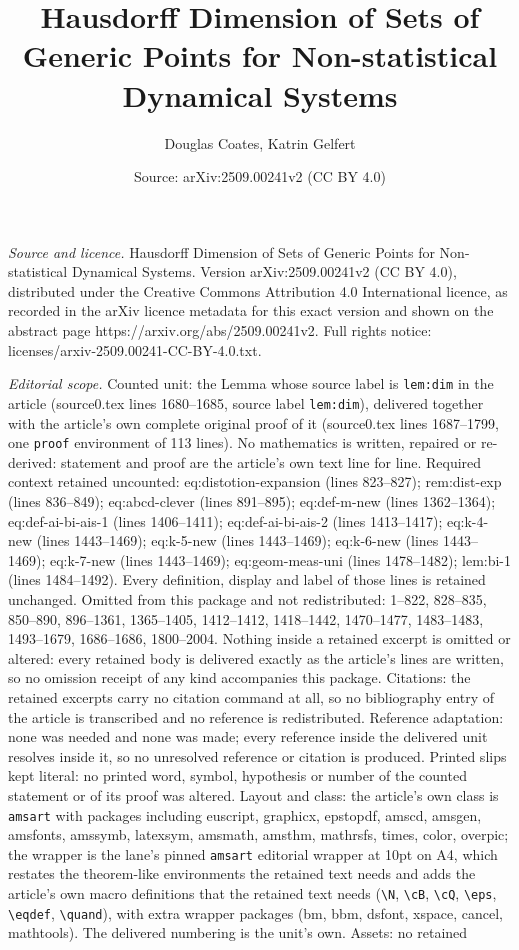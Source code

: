 \documentclass[10pt,a4paper]{amsart}
\title[Hausdorff Dimension of Sets of Generic Points for Non-statis]{Hausdorff Dimension of Sets of Generic Points for Non-statistical Dynamical Systems}
\author{Douglas Coates, Katrin Gelfert}
\date{Source: arXiv:2509.00241v2 (CC BY 4.0)}
\begin{document}
\maketitle

\noindent\emph{Source and licence.} Hausdorff Dimension of Sets of Generic Points for Non-statistical Dynamical Systems. Version arXiv:2509.00241v2 (CC BY 4.0), distributed under the Creative Commons Attribution 4.0 International licence, as recorded in the arXiv licence metadata for this exact version and shown on the abstract page https://arxiv.org/abs/2509.00241v2. Full rights notice: licenses/arxiv-2509.00241-CC-BY-4.0.txt.\par\smallskip

\noindent\textit{Editorial scope.} Counted unit: the Lemma whose source label is \texttt{lem:dim} in the article (source0.tex lines 1680--1685, source label \texttt{lem:dim}), delivered together with the article's own complete original proof of it (source0.tex lines 1687--1799, one \texttt{proof} environment of 113 lines). No mathematics is written, repaired or re-derived: statement and proof are the article's own text line for line. Required context retained uncounted: eq:distotion-expansion (lines 823--827); rem:dist-exp (lines 836--849); eq:abcd-clever (lines 891--895); eq:def-m-new (lines 1362--1364); eq:def-ai-bi-ais-1 (lines 1406--1411); eq:def-ai-bi-ais-2 (lines 1413--1417); eq:k-4-new (lines 1443--1469); eq:k-5-new (lines 1443--1469); eq:k-6-new (lines 1443--1469); eq:k-7-new (lines 1443--1469); eq:geom-meas-uni (lines 1478--1482); lem:bi-1 (lines 1484--1492). Every definition, display and label of those lines is retained unchanged. Omitted from this package and not redistributed: 1--822, 828--835, 850--890, 896--1361, 1365--1405, 1412--1412, 1418--1442, 1470--1477, 1483--1483, 1493--1679, 1686--1686, 1800--2004. Nothing inside a retained excerpt is omitted or altered: every retained body is delivered exactly as the article's lines are written, so no omission receipt of any kind accompanies this package. Citations: the retained excerpts carry no citation command at all, so no bibliography entry of the article is transcribed and no reference is redistributed. Reference adaptation: none was needed and none was made; every reference inside the delivered unit resolves inside it, so no unresolved reference or citation is produced. Printed slips kept literal: no printed word, symbol, hypothesis or number of the counted statement or of its proof was altered. Layout and class: the article's own class is \texttt{amsart} with packages including euscript, graphicx, epstopdf, amscd, amsgen, amsfonts, amssymb, latexsym, amsmath, amsthm, mathrsfs, times, color, overpic; the wrapper is the lane's pinned \texttt{amsart} editorial wrapper at 10pt on A4, which restates the theorem-like environments the retained text needs and adds the article's own macro definitions that the retained text needs (\texttt{\textbackslash N}, \texttt{\textbackslash cB}, \texttt{\textbackslash cQ}, \texttt{\textbackslash eps}, \texttt{\textbackslash eqdef}, \texttt{\textbackslash quand}), with extra wrapper packages (bm, bbm, dsfont, xspace, cancel, mathtools). The delivered numbering is the unit's own. Assets: no retained 
\end{document}
